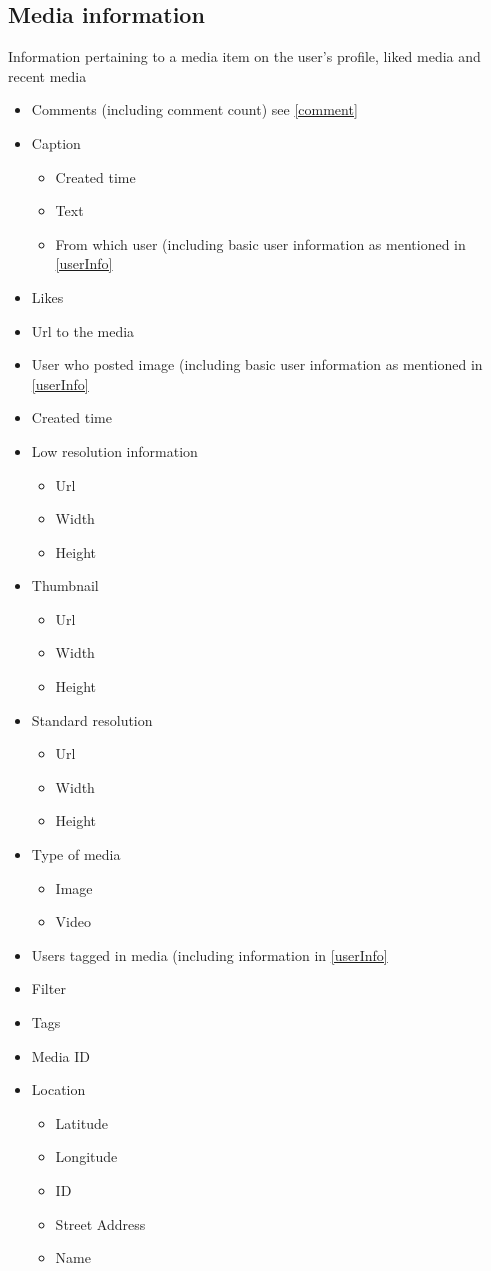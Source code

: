 \documentclass{article}
\begin{document}
\subsection{Media information}\label{Media}
Information pertaining to a media item on the user's profile, liked media and recent media
\begin{itemize}
	\item Comments (including comment count) see \ref{comment}
	\item Caption
	\begin{itemize}
		\item Created time
		\item Text
		\item From which user (including basic user information as mentioned in \ref{userInfo}
	\end{itemize}
	\item Likes
	\item Url to the media
	\item User who posted image (including basic user information as mentioned in \ref{userInfo}
	\item Created time
	\item Low resolution information
		\begin{itemize}
		\item Url
		\item Width
		\item Height
	\end{itemize}
	\item Thumbnail
	\begin{itemize}
		\item Url
		\item Width
		\item Height
	\end{itemize}
	\item Standard resolution
		\begin{itemize}
		\item Url
		\item Width
		\item Height
	\end{itemize}
	\item Type of media
	\begin{itemize}
		\item Image
		\item Video
	\end{itemize}
	\item Users tagged in media (including information in \ref{userInfo}
	\item Filter
	\item Tags
	\item Media ID
	\item Location
	\begin{itemize}
		\item Latitude
		\item Longitude 
		\item ID
		\item Street Address
		\item Name
	\end{itemize}
	
\end{itemize}
\end{document}
